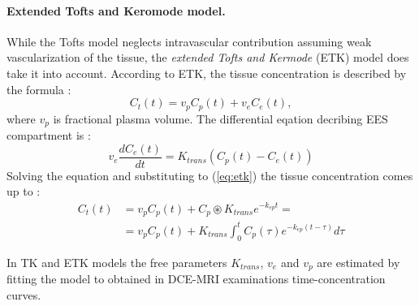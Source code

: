 \paragraph{Extended Tofts and Keromode model.}
While the Tofts model neglects intravascular contribution assuming weak vascularization of the tissue, the \textit{extended Tofts and Kermode} (ETK) model \cite{tofts1997modeling} does take it into account. According to ETK, the tissue concentration is described by the formula \cite{tofts2010t1, khalifa2014models}:
\begin{equation}
C_t(t) = v_pC_p(t) + v_eC_e(t),
\label{eq:etk}
\end{equation}
where $v_p$ is fractional plasma volume. The differential eqation decribing EES compartment is \cite{sourbron2011scope}:
\begin{equation}
	\label{eq:etoft}
	v_e\frac{dC_{e}(t)}{dt} = K_{trans}(C_p(t)-C_e(t))
\end{equation}
Solving the equation and substituting to (\ref{eq:etk}) the tissue concentration comes up to \cite{khalifa2014models, tofts2010t1}:
\begin{align}
	\label{eq:extended_toft}
	C_{t}(t) &=v_pC_p(t) + C_p\circledast K_{trans}e^{-k_{ep}t} =\\
	\nonumber &= v_pC_p(t)+K_{trans}\int_{0}^{t}C_p(\tau)e^{-k_{ep}(t-\tau)}d\tau 
\end{align}


In TK and ETK models the free parameters $K_{trans}$, $v_e$ and $v_p$ are estimated by fitting the model to obtained in DCE-MRI examinations time-concentration curves.  
